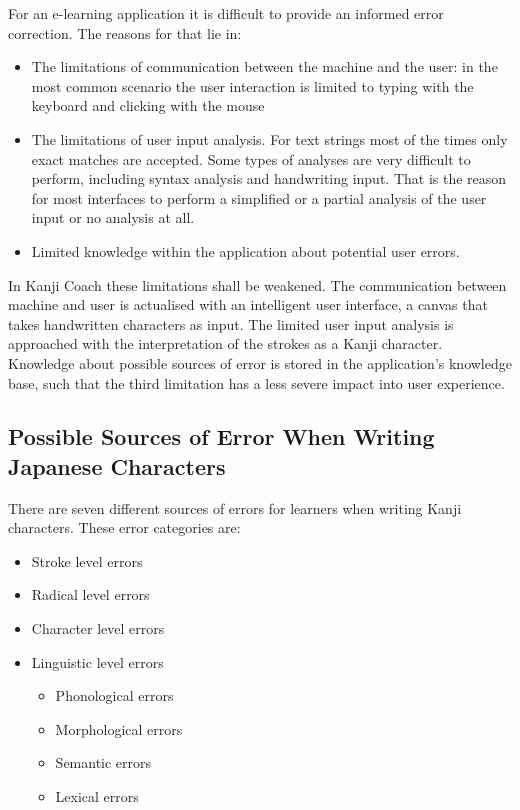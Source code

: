 For an e-learning application it is difficult to provide an informed error 
correction. The reasons for that lie in:
\begin{itemize}
  \item The limitations of communication between the machine and the user:
        in the most common scenario the user interaction is limited to
        typing with the keyboard and clicking with the mouse
  \item The limitations of user input analysis. For text strings most of the
        times only exact matches are accepted. Some types of analyses are very
        difficult to perform, including syntax analysis and handwriting input.
        That is the reason for most interfaces to perform a simplified
        or a partial analysis of the user input or no analysis at all.
  \item Limited knowledge within the application about potential user errors.
\end{itemize}
In Kanji Coach these limitations shall be weakened. The communication between
machine and user is actualised with an intelligent user interface, a canvas that
takes handwritten characters as input. The limited user input analysis is
approached with the interpretation of the strokes as a Kanji character.
Knowledge about possible sources of error is stored in the application's 
knowledge base, such that the third limitation has a less severe impact into
user experience.

\subsection[Sources of Error]{Possible Sources of Error When Writing Japanese Characters}
\label{sec:concept:sourcesoferror}

There are seven different sources of errors for learners when writing Kanji 
characters. These error categories are:
\begin{itemize}
\item Stroke level errors
\item Radical level errors
\item Character level errors
\item Linguistic level errors
  \begin{itemize}
  \item Phonological errors
  \item Morphological errors
  \item Semantic errors
  \item Lexical errors
  \end{itemize}
\end{itemize}

